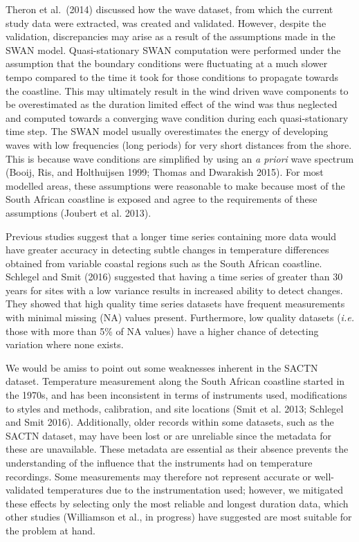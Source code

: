 \documentclass[12pt,a4paper,]{article}
\begin{document}
Theron et al.~(2014) discussed how the wave dataset, from which the
current study data were extracted, was created and validated. However,
despite the validation, discrepancies may arise as a result of the
assumptions made in the SWAN model. Quasi-stationary SWAN computation
were performed under the assumption that the boundary conditions were
fluctuating at a much slower tempo compared to the time it took for
those conditions to propagate towards the coastline. This may ultimately
result in the wind driven wave components to be overestimated as the
duration limited effect of the wind was thus neglected and computed
towards a converging wave condition during each quasi-stationary time
step. The SWAN model usually overestimates the energy of developing
waves with low frequencies (long periods) for very short distances from
the shore. This is because wave conditions are simplified by using an
\emph{a priori} wave spectrum (Booij, Ris, and Holthuijsen 1999; Thomas
and Dwarakish 2015). For most modelled areas, these assumptions were
reasonable to make because most of the South African coastline is
exposed and agree to the requirements of these assumptions (Joubert et
al. 2013).

Previous studies suggest that a longer time series containing more data
would have greater accuracy in detecting subtle changes in temperature
differences obtained from variable coastal regions such as the South
African coastline. Schlegel and Smit (2016) suggested that having a time
series of greater than 30 years for sites with a low variance results in
increased ability to detect changes. They showed that high quality time
series datasets have frequent measurements with minimal missing (NA)
values present. Furthermore, low quality datasets (\emph{i.e.} those
with more than 5\% of NA values) have a higher chance of detecting
variation where none exists.

We would be amiss to point out some weaknesses inherent in the SACTN
dataset. Temperature measurement along the South African coastline
started in the 1970s, and has been inconsistent in terms of instruments
used, modifications to styles and methods, calibration, and site
locations (Smit et al. 2013; Schlegel and Smit 2016). Additionally,
older records within some datasets, such as the SACTN dataset, may have
been lost or are unreliable since the metadata for these are
unavailable. These metadata are essential as their absence prevents the
understanding of the influence that the instruments had on temperature
recordings. Some measurements may therefore not represent accurate or
well-validated temperatures due to the instrumentation used; however, we
mitigated these effects by selecting only the most reliable and longest
duration data, which other studies (Williamson et al., in progress) have
suggested are most suitable for the problem at hand.
\end{document}
